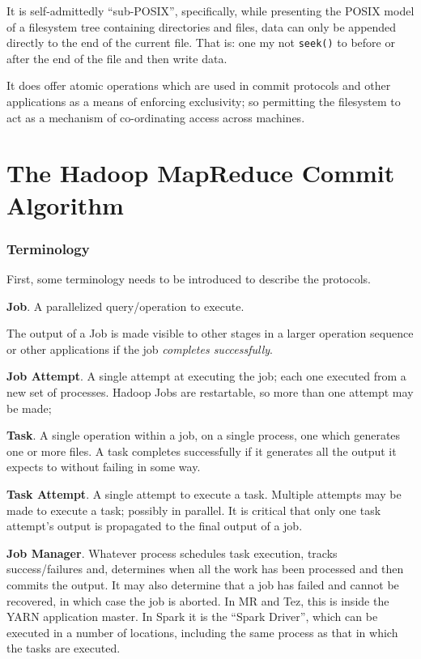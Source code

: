 \documentclass[conference]{IEEEtran}
\begin{document}
It is self-admittedly ``sub-POSIX'', specifically, while presenting the POSIX
model of a filesystem tree containing directories and files, data can only be
appended directly to the end of the current file.
That is: one my not \texttt{seek()} to before or after the end of the file and
then write data.

It does offer atomic operations which are used in commit protocols and other
applications as a means of enforcing exclusivity;
so permitting the filesystem to act as a mechanism of co-ordinating access across machines.


\section{The Hadoop MapReduce Commit Algorithm}
\label{sec:commit}


\subsubsection{Terminology}

First, some terminology needs to be introduced to describe
the protocols.


\textbf{Job}.
A parallelized query/operation to execute.

The output of a Job is made visible to other stages in a larger operation
sequence or other applications if the job \emph{completes successfully}.

\textbf{Job Attempt}.
A single attempt at executing the job;
each one executed from a new set of processes.
Hadoop Jobs are restartable, so more than one attempt may be made;

\textbf{Task}.
A single operation within a job, on a single process, one which generates
one or more files.
A task completes successfully if it generates all the output it expects to without
failing in some way.

\textbf{Task Attempt}.
A single attempt to execute a task.
Multiple attempts may be made to execute a task;
possibly in parallel.
It is critical that only one task attempt's output is propagated
to the final output of a job.


\textbf{Job Manager}.
Whatever process schedules
task execution, tracks success/failures and, determines when all the work has been
processed and then commits the output.
It may also determine that a job
has failed and cannot be recovered, in which case the job is aborted.
In MR and Tez, this is inside the YARN application master.
In Spark it is the ``Spark Driver'', which can be executed in a number of
locations, including the same process as that in which the tasks are executed.
\end{document}
